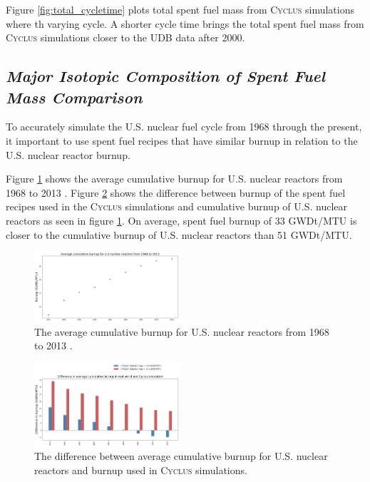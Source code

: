 \documentclass{anstrans}
\newcommand{\Cyclus}{\textsc{Cyclus}\xspace}%
\begin{document}
Figure \ref{fig:total_cycletime} plots total spent fuel mass from 
\Cyclus simulations where th varying cycle. A shorter cycle time brings the 
total spent fuel mass from \Cyclus simulations closer to the UDB data after 
2000. 

\subsection{\textit{Major Isotopic Composition of  Spent Fuel Mass Comparison}}
To accurately simulate the U.S. nuclear fuel cycle from 1968 through the present, 
it important to use spent fuel recipes that have similar burnup in relation to 
the U.S. nuclear reactor burnup. 

Figure \ref{fig:burn_up_real} shows the average cumulative burnup for U.S. 
nuclear reactors from 1968 to 2013 \cite{eia_spent_2015}. Figure 
\ref{fig:burn_up_difference} shows the difference between burnup of the spent 
fuel recipes used in the \Cyclus simulations and cumulative burnup of U.S. 
nuclear reactors as seen in figure \ref{fig:burn_up_real}. On average, spent 
fuel burnup of 33 GWDt/MTU is closer to the cumulative burnup of U.S. nuclear 
reactors than 51 GWDt/MTU. 

\begin{figure}[t] %
	\centering
	\includegraphics[width=0.48\textwidth]{figures/burn_up_real}
	\caption{The average cumulative burnup for U.S. nuclear reactors from 1968 to 2013 \cite{eia_spent_2015}.}
	\label{fig:burn_up_real}
\end{figure} 

\begin{figure}[t] %
	\centering
	\includegraphics[width=0.48\textwidth]{figures/burn_up_difference}
	\caption{The difference between average cumulative burnup for U.S. nuclear reactors and burnup used in \Cyclus simulations.}
	\label{fig:burn_up_difference}
\end{figure} 
\end{document}
